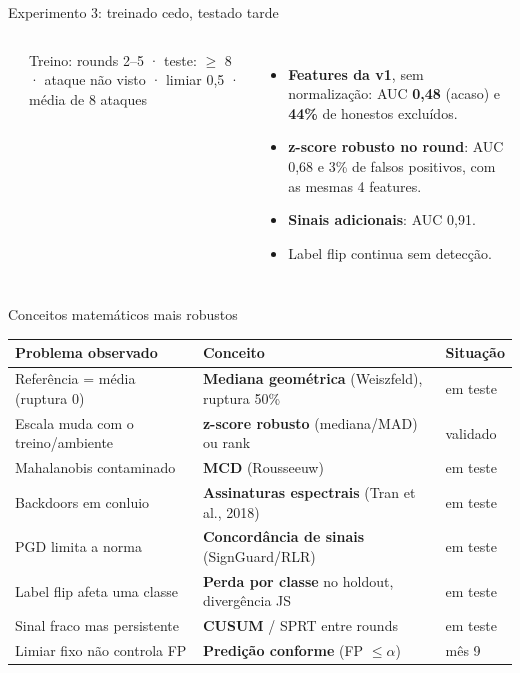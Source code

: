 \documentclass[aspectratio=169,11pt,xcolor=table]{beamer}
\newcommand{\ok}{\textcolor{hiaacnavy}{\ding{51}}}
\newcommand{\hl}[1]{\textcolor{hiaacbar}{\textbf{#1}}}
\begin{document}
\begin{frame}{Experimento 3: treinado cedo, testado tarde}
  \begin{columns}[T]
    \centering\small
    \resizebox{\linewidth}{!}{}\\[0.3em]
    \raggedright{\footnotesize Treino: rounds 2--5 · teste: $\geq$ 8 · ataque não visto · limiar 0,5 · média de 8 ataques}
    \begin{itemize}
      \item \textbf{Features da v1}, sem normalização: AUC \hl{0,48} (acaso) e \hl{44\%} de honestos excluídos.
      \item \textbf{z-score robusto no round}: AUC 0,68 e 3\% de falsos positivos, com as mesmas 4 features.
      \item \textbf{Sinais adicionais}: AUC 0,91.
      \item Label flip continua sem detecção.
    \end{itemize}
  \end{columns}
\end{frame}


\begin{frame}{Conceitos matemáticos mais robustos}
  \footnotesize
  \begin{tabular}{p{4.4cm}p{6.6cm}p{1.8cm}}
    \toprule
    Problema observado & Conceito & Situação \\
    \midrule
    Referência = média (ruptura 0) & \textbf{Mediana geométrica} (Weiszfeld), ruptura 50\% & em teste \\
    Escala muda com o treino/ambiente & \textbf{z-score robusto} (mediana/MAD) ou rank & \ok{} validado \\
    Mahalanobis contaminado & \textbf{MCD} (Rousseeuw) & em teste \\
    Backdoors em conluio & \textbf{Assinaturas espectrais} (Tran et al., 2018) & em teste \\
    PGD limita a norma & \textbf{Concordância de sinais} (SignGuard/RLR) & em teste \\
    Label flip afeta uma classe & \textbf{Perda por classe} no holdout, divergência JS & em teste \\
    Sinal fraco mas persistente & \textbf{CUSUM} / SPRT entre rounds & em teste \\
    Limiar fixo não controla FP & \textbf{Predição conforme} (FP $\leq \alpha$) & mês 9 \\
    \bottomrule
  \end{tabular}
\end{frame}
\end{document}

